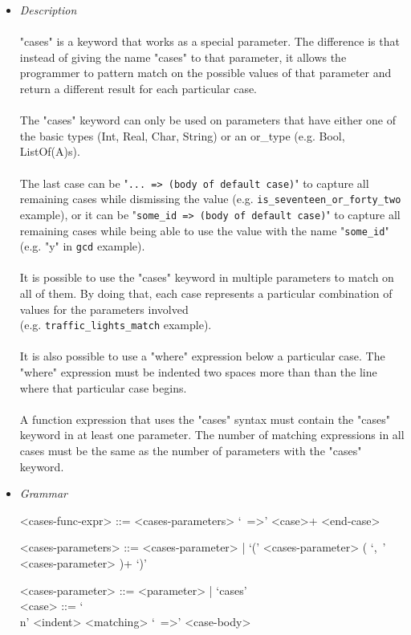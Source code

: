 \documentclass{article}
\begin{document}
\begin{itemize}
\item \textit{Description}\\\\
"cases" is a keyword that works as a special parameter. The difference is that
instead of giving the name "cases" to that parameter, it allows the programmer
to pattern match on the possible values of that parameter and return a
different result for each particular case. 
\\\\
The "cases" keyword can only be used on parameters that have either one of the 
basic types (Int, Real, Char, String) or an or\_type (e.g. Bool, ListOf(A)s).
\\\\
The last case can be "\texttt{... => (body of default case)}" to capture all
remaining cases while dismissing the value (e.g.
\texttt{is_seventeen_or_forty_two} example), or it can be
"\texttt{some_id => (body of default case)}" to capture all remaining
cases while being able to use the value with the name "\texttt{some_id}"
(e.g.  "y" in \texttt{gcd} example).
\\\\
It is possible to use the "cases" keyword in multiple parameters to match on all
of them. By doing that, each case represents a particular combination of values
for the parameters involved\\(e.g. \texttt{traffic_lights_match} example).
\\\\
It is also possible to use a "where" expression below a particular case. The
"where" expression must be indented two spaces more than than the line where
that particular case begins.
\\\\
A function expression that uses the "cases" syntax must contain the "cases"
keyword in at least one parameter. The number of matching expressions in 
all cases must be the same as the number of parameters with the "cases" keyword.

\item \textit{Grammar}
\begin{grammar}
<cases-func-expr> ::= <cases-parameters> `\ =>' <case>+ <end-case> 

<cases-parameters> ::=
<cases-parameter> | `(' <cases-parameter> ( `,\ ' <cases-parameter> )+ `)'

<cases-parameter> ::= <parameter> | `cases' \\

<case> ::=  `\\n' <indent> <matching> `\ =>' <case-body>


\end{grammar}
\end{itemize}
\end{document}
